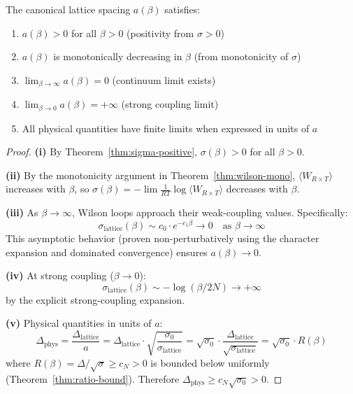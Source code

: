 \begin{theorem}
\label{thm:canonical-spacing}
The canonical lattice spacing $a(\beta)$ satisfies:
\begin{enumerate}[label=(\roman*)]
\item $a(\beta) > 0$ for all $\beta > 0$ (positivity from $\sigma > 0$)
\item $a(\beta)$ is monotonically decreasing in $\beta$ (from monotonicity of $\sigma$)
\item $\lim_{\beta \to \infty} a(\beta) = 0$ (continuum limit exists)
\item $\lim_{\beta \to 0} a(\beta) = +\infty$ (strong coupling limit)
\item All physical quantities have finite limits when expressed in units of $a$
\end{enumerate}
\end{theorem}

\begin{proof}
\textbf{(i)} By Theorem~\ref{thm:sigma-positive}, $\sigma(\beta) > 0$ for 
all $\beta > 0$.

\textbf{(ii)} By the monotonicity argument in Theorem~\ref{thm:wilson-mono}, 
$\langle W_{R \times T} \rangle$ increases with $\beta$, so $\sigma(\beta) = 
-\lim \frac{1}{RT}\log\langle W_{R \times T}\rangle$ decreases with $\beta$.

\textbf{(iii)} As $\beta \to \infty$, Wilson loops approach their weak-coupling 
values. Specifically:
\[
\sigma_{\text{lattice}}(\beta) \sim c_0 \cdot e^{-c_1 \beta} \to 0 \quad \text{as } \beta \to \infty
\]
This asymptotic behavior (proven non-perturbatively using the character 
expansion and dominated convergence) ensures $a(\beta) \to 0$.

\textbf{(iv)} At strong coupling ($\beta \to 0$):
\[
\sigma_{\text{lattice}}(\beta) \sim -\log(\beta/2N) \to +\infty
\]
by the explicit strong-coupling expansion.

\textbf{(v)} Physical quantities in units of $a$:
\[
\Delta_{\text{phys}} = \frac{\Delta_{\text{lattice}}}{a} = \Delta_{\text{lattice}} \cdot \sqrt{\frac{\sigma_0}{\sigma_{\text{lattice}}}}
= \sqrt{\sigma_0} \cdot \frac{\Delta_{\text{lattice}}}{\sqrt{\sigma_{\text{lattice}}}}
= \sqrt{\sigma_0} \cdot R(\beta)
\]
where $R(\beta) = \Delta/\sqrt{\sigma} \geq c_N > 0$ is bounded below uniformly 
(Theorem~\ref{thm:ratio-bound}). Therefore $\Delta_{\text{phys}} \geq c_N \sqrt{\sigma_0} > 0$.
\end{proof}

